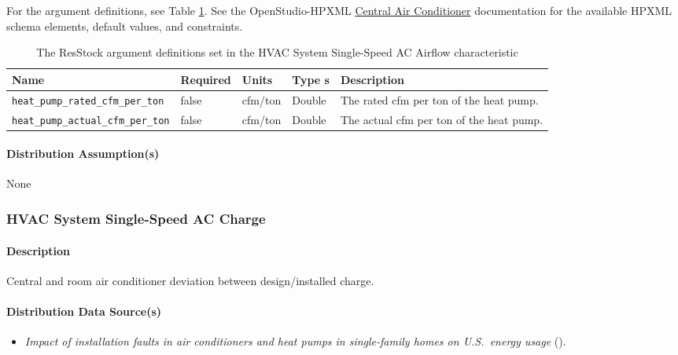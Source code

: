 For the argument definitions, see Table \ref{table:hc_arg_def_hvac_ss_ac_airflow}. See the OpenStudio-HPXML \href{-https://openstudio-hpxml.readthedocs.io/en/v1.8.1/workflow_inputs.html#central-air-conditioner}{Central Air Conditioner} documentation for the available HPXML schema elements, default values, and constraints.

\begin{longtable}[]{|p{3.5cm}|p{1.5cm}|p{1.3cm}|p{1.1cm}|p{3.5cm}|} \caption{The ResStock argument definitions set in the HVAC System Single-Speed AC Airflow characteristic} \label{table:hc_arg_def_hvac_ss_ac_airflow}\\
\toprule\noalign{}
Name & Required & Units & Type s & Description \\
\midrule\noalign{}
\endhead
\bottomrule\noalign{}
\endlastfoot
\texttt{heat\_pump\_rated\_cfm\_per\_ton} & false & cfm/ton & Double & 
The rated cfm per ton of the heat pump. \\
\hline
\texttt{heat\_pump\_actual\_cfm\_per\_ton} & false & cfm/ton & Double 
& The actual cfm per ton of the heat pump. \\
\end{longtable}
\paragraph{Distribution Assumption(s)}
None

\subsubsection{HVAC System Single-Speed AC Charge}

\paragraph{Description}
Central and room air conditioner deviation between design/installed charge.

\paragraph{Distribution Data Source(s)}
\begin{itemize}
\item 

\textit{Impact of installation faults in air conditioners and heat pumps in single-family homes on U.S.~energy usage} (\cite{Winkler2020}).

\end{itemize}

